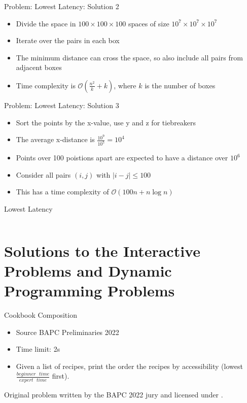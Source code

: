 \documentclass[11pt,pdf, aspectratio=169]{beamer}
\begin{document}
  \begin{frame}{Problem: Lowest Latency: Solution 2}
    \begin{itemize}
      \item Divide the space in $100\times 100 \times 100$ spaces of size $10^7 \times 10^7 \times 10^7$
      \item Iterate over the pairs in each box
      \item The minimum distance can cross the space, so also include all pairs from adjacent boxes
      \item Time complexity is $\mathcal{O}\left(\frac{n^2}{k} + k\right)$, where $k$ is the number of boxes
    \end{itemize}
  \end{frame}
  \begin{frame}{Problem: Lowest Latency: Solution 3}
    \begin{itemize}
      \item Sort the points by the x-value, use y and z for tiebreakers
      \item The average x-distance is $\frac{10^9}{10^5} = 10^4$
      \item Points over 100 poistions apart are expected to have a distance over $10^6$
      \item Consider all pairs $(i, j)$ with $|i-j| \leq 100$
      \item This has a time complexity of $\mathcal{O}(100n + n \log n)$
    \end{itemize}
  \end{frame}
\begin{frame}[containsverbatim]{Lowest Latency}
  \inputminted{python}{code/session-4/bapc-l.py}
\end{frame}


  \section{Solutions to the Interactive Problems and Dynamic Programming Problems}
  \begin{frame}{Cookbook Composition}
    \begin{itemize}
      \item Source BAPC Preliminaries 2022
      \item Time limit: 2s
      \item Given a list of recipes, print the order the recipes by accessibility (lowest $\frac{beginner\text{ }time}{expert\text{ }time}$ first).

    \end{itemize}
    Original problem written by the BAPC 2022 jury and licensed under \doclicenseLongNameRef.

    \doclicenseImage
  \end{frame}
\end{document}
